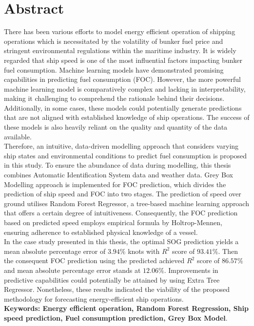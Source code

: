 \chapter*{Abstract}

There has been various efforts to model energy efficient operation of shipping operations which is necessitated by the volatility of bunker fuel price and stringent environmental regulations within the maritime industry. It is widely regarded that ship speed is one of the most influential factors impacting bunker fuel consumption. Machine learning models have demonstrated promising capabilities in predicting fuel consumption (FOC). However, the more powerful machine learning model is comparatively complex and lacking in interpretability, making it challenging to comprehend the rationale behind their decisions. Additionally, in some cases, these models could potentially generate predictions that are not aligned with established knowledge of ship operations. The success of these models is also heavily reliant on the quality and quantity of the data available.\\

Therefore, an intuitive, data-driven modelling approach that considers varying ship states and environmental conditions to predict fuel consumption is proposed in this study. To ensure the abundance of data during modelling, this thesis combines Automatic Identification System data and weather data. Grey Box Modelling approach is implemented for FOC prediction, which divides the prediction of ship speed and FOC into two stages. The prediction of speed over ground utilises Random Forest Regressor, a tree-based machine learning approach that offers a certain degree of intuitiveness. Consequently, the FOC prediction based on predicted speed employs empirical formula by Holtrop-Mennen, ensuring adherence to established physical knowledge of a vessel.\\

In the case study presented in this thesis, the optimal SOG prediction yields a mean absolute percentage error of $3.94\%$ knots with $R^2$ score of $93.41\%$. Then the consequent FOC prediction using the predicted achieved $R^2$ score of $86.57\%$ and mean absolute percentage error stands at $12.06\%$. Improvements in predictive capabilities could potentially be attained by using Extra Tree Regressor. Nonetheless, these results indicated the viability of the proposed methodology for forecasting energy-efficient ship operations.\\



\textbf{\small Keywords: Energy efficient operation, Random Forest Regression, Ship speed prediction, Fuel consumption prediction, Grey Box Model}.